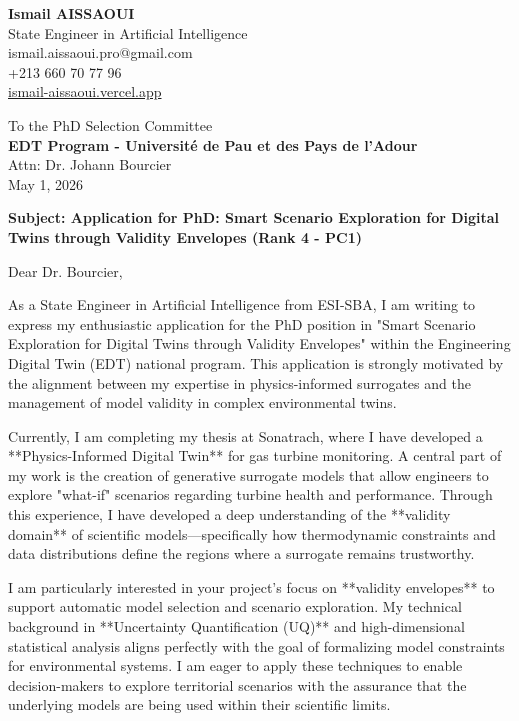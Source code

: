 \documentclass[a4paper,12pt]{article}
\begin{document}
\begin{flushleft}
    \textbf{Ismail AISSAOUI} \\
    State Engineer in Artificial Intelligence \\
    ismail.aissaoui.pro@gmail.com \\
    +213 660 70 77 96 \\
    \href{https://ismail-aissaoui.vercel.app}{ismail-aissaoui.vercel.app}
\end{flushleft}

\begin{flushright}
    To the PhD Selection Committee \\
    \textbf{EDT Program - Université de Pau et des Pays de l’Adour} \\
    Attn: Dr. Johann Bourcier \\
    \medskip
    May 1, 2026
\end{flushright}

\bigskip

\noindent \textbf{Subject: Application for PhD: Smart Scenario Exploration for Digital Twins through Validity Envelopes (Rank 4 - PC1)}

\bigskip

Dear Dr. Bourcier,

As a State Engineer in Artificial Intelligence from ESI-SBA, I am writing to express my enthusiastic application for the PhD position in "Smart Scenario Exploration for Digital Twins through Validity Envelopes" within the Engineering Digital Twin (EDT) national program. This application is strongly motivated by the alignment between my expertise in physics-informed surrogates and the management of model validity in complex environmental twins.

Currently, I am completing my thesis at Sonatrach, where I have developed a **Physics-Informed Digital Twin** for gas turbine monitoring. A central part of my work is the creation of generative surrogate models that allow engineers to explore "what-if" scenarios regarding turbine health and performance. Through this experience, I have developed a deep understanding of the **validity domain** of scientific models—specifically how thermodynamic constraints and data distributions define the regions where a surrogate remains trustworthy.

I am particularly interested in your project's focus on **validity envelopes** to support automatic model selection and scenario exploration. My technical background in **Uncertainty Quantification (UQ)** and high-dimensional statistical analysis aligns perfectly with the goal of formalizing model constraints for environmental systems. I am eager to apply these techniques to enable decision-makers to explore territorial scenarios with the assurance that the underlying models are being used within their scientific limits.
\end{document}
